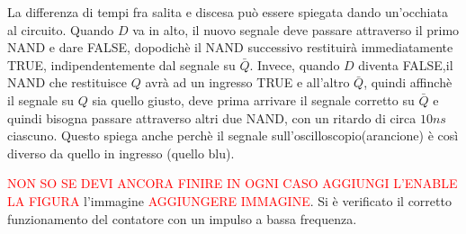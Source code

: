 \documentclass[10pt,a4paper]{article}
\begin{document}
La differenza di tempi fra salita e discesa può essere spiegata dando un'occhiata al circuito. Quando $D$ va in alto, il nuovo segnale deve passare attraverso il primo NAND e dare FALSE, dopodichè il NAND successivo restituirà immediatamente TRUE, indipendentemente dal segnale su $\bar{Q}$. Invece, quando $D$ diventa FALSE,il NAND che restituisce $Q$ avrà ad un ingresso TRUE e all'altro $\bar{Q}$, quindi affinchè il segnale su $Q$ sia quello giusto, deve prima arrivare il segnale corretto su $\bar{Q}$ e quindi bisogna passare attraverso altri due NAND, con un ritardo di circa $10 ns$ ciascuno. Questo spiega anche perchè il segnale sull'oscilloscopio(arancione) è così diverso da quello in ingresso (quello blu).

\textcolor{red}{NON SO SE DEVI ANCORA FINIRE IN OGNI CASO AGGIUNGI L'ENABLE LA FIGURA}
l'immagine \textcolor{red}{AGGIUNGERE IMMAGINE}.
Si è verificato il corretto funzionamento del contatore con un impulso a bassa frequenza.                                                                                                                                                                                                                                                   
\end{document}
